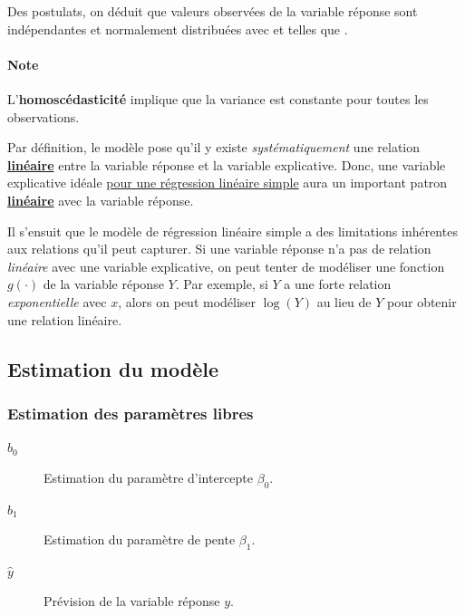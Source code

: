 \documentclass[french]{article}
\begin{document}
\begin{multicols*}{2}
\begin{definitionNOHFILLprop}
\bigskip

Des postulats, on déduit que valeurs observées de la variable réponse sont indépendantes et normalement distribuées avec  et  telles que .
\end{definitionNOHFILLprop}


\paragraph{Note}	L'\textbf{\hypertarget{homoscedasticity}{homoscédasticité}} implique que la variance est constante pour toutes les observations.

\bigskip

\begin{rappel_enhanced}[Limitations]
Par définition, le modèle pose qu'il y existe \textit{systématiquement} une relation \textbf{\underline{linéaire}} entre la variable réponse et la variable explicative. Donc, une variable explicative idéale \underline{pour une régression linéaire simple} aura un important patron \textbf{\underline{linéaire}} avec la variable réponse.

\bigskip

Il s'ensuit que le modèle de régression linéaire simple a des limitations inhérentes aux relations qu'il peut capturer. Si une variable réponse n'a pas de relation \textit{linéaire} avec une variable explicative, on peut tenter de modéliser une fonction $g(\cdot)$ de la variable réponse $Y$. Par exemple, si $Y$ a une forte relation \textit{exponentielle} avec $x$, alors on peut modéliser $\log(Y)$ au lieu de $Y$ pour obtenir une relation linéaire.
\end{rappel_enhanced}



\columnbreak
\subsection{Estimation du modèle}\label{subsec:SLREstimation}
\subsubsection{Estimation des paramètres libres}
\begin{distributions}[Notation]
\begin{description}
	\item[$b_{0}$]	Estimation du paramètre d'intercepte $\beta_{0}$.
	\item[$b_{1}$]	Estimation du paramètre de pente $\beta_{1}$.
	\item[$\hat{y}$]	Prévision de la variable réponse $y$.
\end{description}
\end{distributions}


\end{multicols*}
\end{document}
